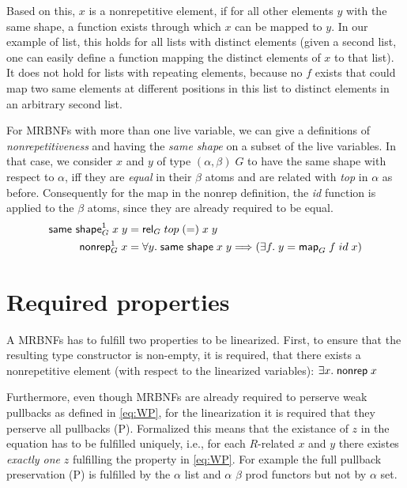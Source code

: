     Based on this, $x$ is a nonrepetitive element, if for all other elements $y$ with the same shape, a function exists through which $x$ can be mapped to $y$. In our example of \textsf{list}, this holds for all lists with distinct elements (given a second list, one can easily define a function mapping the distinct elements of $x$ to that list). It does not hold for lists with repeating elements, because no $f$ exists that could map two same elements at different positions in this list to distinct elements in an arbitrary second list.

    For \acp{MRBNF} with more than one live variable, we can give a definitions of \textit{nonrepetitiveness} and having the \textit{same shape} on a subset of the live variables. In that case, we consider $x$ and $y$ of type $(\alpha, \beta)\; G$ to have the same shape with respect to $\alpha$, iff they are \textit{equal} in their $\beta$ atoms and are related with \textit{top} in $\alpha$ as before. Consequently for the map in the \textsf{nonrep} definition, the \textit{id} function is applied to the $\beta$ atoms, since they are already required to be equal. 
    \begin{align}
      \text{\textsf{same shape}}_G^1\; x\; y &= \text{\textsf{rel}}_G\; top\; (=)\; x\; y\\
      \text{\textsf{nonrep}}_G^1\; x &= \forall y.\; \text{\textsf{same shape}}\; x\; y \Longrightarrow (\exists f.\; y = \text{\textsf{map}}_G\; f\; id\; x)
    \end{align}
    
    
  \section{Required properties}
    A \acp{MRBNF} has to fulfill two properties to be linearized. First, to ensure that the resulting type constructor is non-empty, it is required, that there exists a nonrepetitive element (with respect to the linearized variables): $\exists x.\; \text{\textsf{nonrep}}\; x$

    Furthermore, even though \acp{MRBNF} are already required to perserve weak pullbacks as defined in \autoref{eq:WP}, for the linearization it is required that they perserve all pullbacks (P). Formalized this means that the existance of $z$ in the equation has to be fulfilled uniquely, i.e., for each $R$-related $x$ and $y$ there existes \textit{exactly one} $z$ fulfilling the property in \autoref{eq:WP}. For example the full pullback preservation (P) is fulfilled by the \textsf{$\alpha$ list} and \textsf{$\alpha$ $\beta$ prod} functors but not by \textsf{$\alpha$ set}. 

